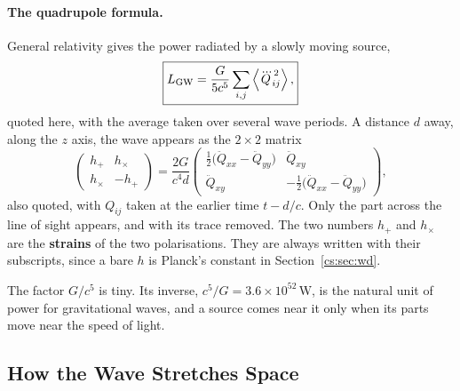\paragraph{The quadrupole formula.} General relativity gives the power radiated by a slowly moving source,
\begin{equation}
	\boxed{L_{\rm GW}=\frac{G}{5c^5}\sum_{i,j}\left\langle \dddot Q_{ij}^{\,2}\right\rangle,}
	\label{cs:eq:quadrupole}
\end{equation}
quoted here, with the average taken over several wave periods. A distance $d$ away, along the $z$ axis, the wave appears as the $2\times2$ matrix
\begin{equation}
	\begin{pmatrix} h_+ & h_\times\\ h_\times & -h_+\end{pmatrix}
	=\frac{2G}{c^4d}
	\begin{pmatrix} \tfrac12\big(\ddot Q_{xx}-\ddot Q_{yy}\big) & \ddot Q_{xy}\\ \ddot Q_{xy} & -\tfrac12\big(\ddot Q_{xx}-\ddot Q_{yy}\big)\end{pmatrix},
	\label{cs:eq:strain_Q}
\end{equation}
also quoted, with $Q_{ij}$ taken at the earlier time $t-d/c$. Only the part across the line of sight appears, and with its trace removed. The two numbers $h_+$ and $h_\times$ are the \textbf{strains} of the two polarisations. They are always written with their subscripts, since a bare $h$ is Planck's constant in Section~\ref{cs:sec:wd}.

The factor $G/c^5$ is tiny. Its inverse, $c^5/G=3.6\times10^{52}\,\mathrm W$, is the natural unit of power for gravitational waves, and a source comes near it only when its parts move near the speed of light.

\subsection{How the Wave Stretches Space}

